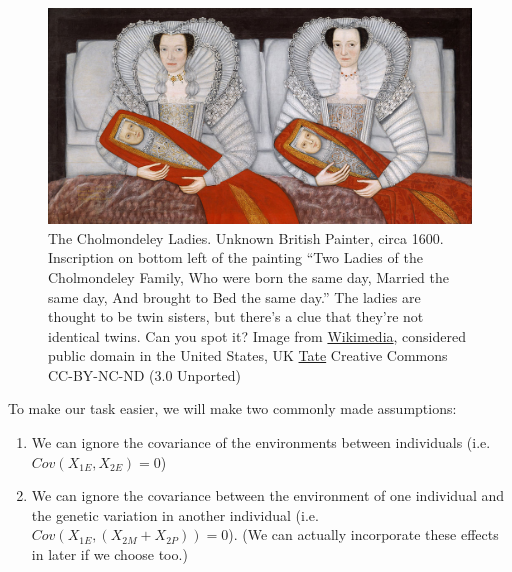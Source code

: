 \begin{figure}
 \begin{center}
 \includegraphics[width=\textwidth]{illustration_images/Quant_gen/Cholmondeley_Ladies/1024px-British_School_17th_century_-_The_Cholmondeley_Ladies_-_Google_Art_Project.jpg}
 \end{center}

  \caption{The Cholmondeley Ladies. Unknown British Painter, circa
    1600. Inscription on bottom left of the painting ``Two Ladies of
    the Cholmondeley Family, Who were born the same day, Married the
    same day, And brought to Bed the same day.'' The ladies are
    thought to be twin sisters, but there's a clue that they're not
    identical twins. Can you spot it?
    \newline \noindent  \tiny{  Image from
      \href{https://commons.wikimedia.org/wiki/File:British_School_17th_century_-_The_Cholmondeley_Ladies_-_Google_Art_Project.jpg}{Wikimedia},
      considered public domain in the United States, UK
      \href{https://www.tate.org.uk/art/artworks/unknown-artist-britain-the-cholmondeley-ladies-t00069}{Tate}
      \textcopyright Creative Commons
      CC-BY-NC-ND (3.0 Unported)}} \label{Fig:The_Cholmondeley_Ladies}
   \end{figure}

To make our task easier, we will make two commonly made assumptions:
\begin{enumerate}
\item We can ignore the covariance of the environments
between individuals (i.e. $Cov(X_{1E},X_{2E})=0$)
\item We can ignore the covariance
between the environment of one individual and the
genetic variation in another individual (i.e. $Cov(X_{1E},(X_{2M}+X_{2P}))=0$). (We can actually incorporate these effects in later if we choose too.)
\end{enumerate}

